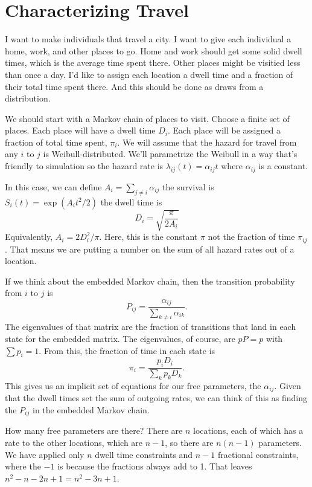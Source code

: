 \documentclass{article}
\begin{document}
\section{Characterizing Travel}


I want to make individuals that travel a city. I want to give each individual a home, work, and other places to go.
Home and work should get some solid dwell times, which is the average time spent there. Other places might be visitied less than once a day.
I'd like to assign each location a dwell time and a fraction of their total time spent there. And this should be done as draws from a distribution.

We should start with a Markov chain of places to visit.
Choose a finite set of places. Each place will have a dwell time $D_i$. Each place will be assigned a fraction of total time spent, $\pi_i$.
We will assume that the hazard for travel from any $i$ to $j$ is Weibull-distributed. We'll parametrize the Weibull in a way that's friendly to simulation so the hazard rate is $\lambda_{ij}(t)=\alpha_{ij}t$ where $\alpha_{ij}$ is a constant.

In this case, we can define $A_i=\sum_{j\ne i}\alpha_{ij}$ the survival is $S_i(t)=\exp(A_it^2/2)$ the dwell time is
$$
  D_i = \sqrt{\frac{\pi}{2A_i}}
$$
Equivalently, $A_i=2D_i^2/\pi$.
Here, this is the constant $\pi$ not the fraction of time $\pi_{ij}$. That means we are putting a number on the sum of all hazard rates out of a location.

If we think about the embedded Markov chain, then the transition probability from $i$ to $j$ is
$$
P_{ij}=\frac{\alpha_{ij}}{\sum_{k\ne i}\alpha_{ik}}.
$$
The eigenvalues of that matrix are the fraction of transitions that land in each state for the embedded matrix. The eigenvalues, of course, are $pP=p$ with $\sum{p_i}=1$.
From this, the fraction of time in each state is
\begin{equation}
  \pi_i=\frac{p_iD_i}{\sum_kp_kD_k}.
\end{equation}
This gives us an implicit set of equations for our free parameters, the $\alpha_{ij}$. Given that the dwell times set the sum of outgoing rates, we can think of this as finding the $P_{ij}$ in the embedded Markov chain.

How many free parameters are there? There are $n$ locations, each of which has a rate to the other locations, which are $n-1$, so there are $n(n-1)$ parameters. We have applied only $n$ dwell time constraints and $n-1$ fractional constraints, where the $-1$ is because the fractions always add to 1. That leaves $n^2-n-2n+1=n^2-3n+1$.
\end{document}
